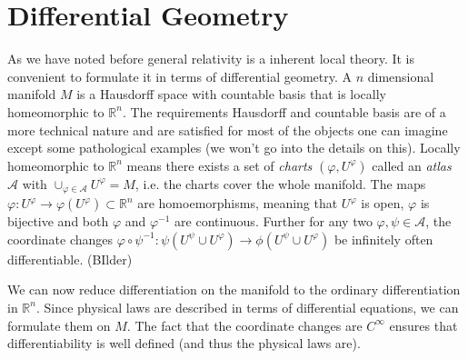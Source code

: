 \chapter{Differential Geometry}
As we have noted before general relativity is a inherent local theory. It is convenient to formulate it in terms of differential geometry.
A $n$ dimensional manifold $M$ is a Hausdorff space with countable basis that is locally homeomorphic to $\mathbb{R}^n$. 
The requirements Hausdorff and countable basis are of a more technical nature and are satisfied for most of the objects one can imagine 
except some pathological examples (we won't go into the details on this).
Locally homeomorphic to $\mathbb{R}^n$ means there exists a set of \emph{charts} 
$(\varphi,U^\varphi)$ called an \emph{atlas} $\mathcal{A}$ with $\cup_{\varphi\in\mathcal{A}} U^\varphi =M$, 
i.e. the charts cover the whole manifold. The maps $\varphi:U^\varphi\to \varphi(U^\varphi)\subset\mathbb{R}^n $ are homoemorphisms, 
meaning that $U^\varphi$ is open, $\varphi$ is bijective and both $\varphi$ and $\varphi^{-1}$ are continuous.
Further for any two $\varphi,\psi\in \mathcal{A}$, the coordinate changes 
$\varphi\circ\psi^{-1}:\psi(U^\psi\cup U^\varphi)\to \phi(U^\psi\cup U^\varphi)$ be infinitely often differentiable.
(BIlder)

We can now reduce differentiation on the manifold to the ordinary differentiation in $\mathbb{R}^n$. 
Since physical laws are described in terms of differential equations, we can formulate them on $M$. 
The fact that the coordinate changes are $C^\infty$ ensures that differentiability is well defined (and thus the physical laws are).


